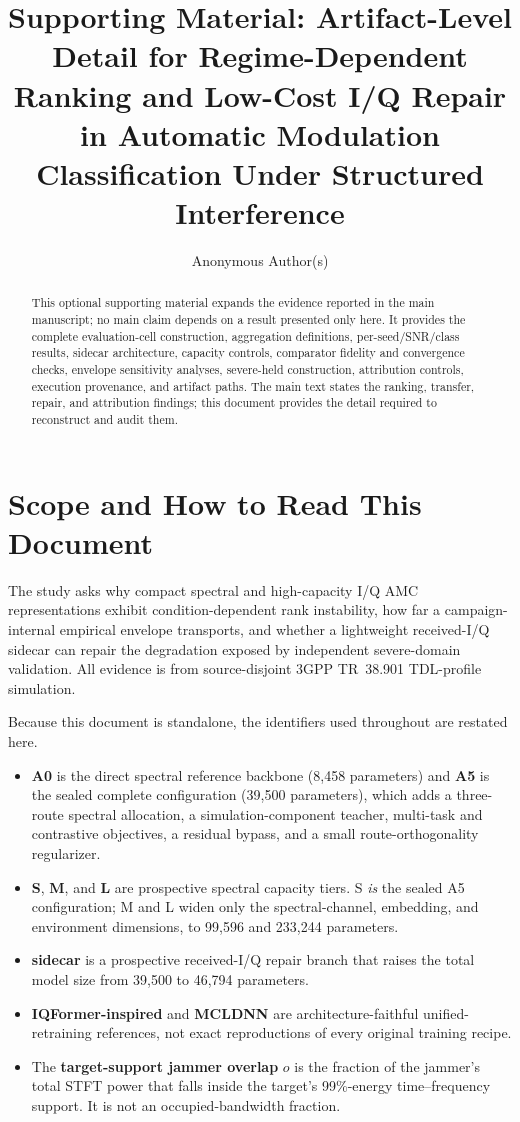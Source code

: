 \documentclass[letterpaper,onecolumn,11pt,journal]{IEEEtran}
\title{Supporting Material: Artifact-Level Detail for Regime-Dependent Ranking
and Low-Cost I/Q Repair in Automatic Modulation Classification Under Structured
Interference}
\author{Anonymous Author(s)}
\begin{document}
\maketitle

\begin{abstract}
This optional supporting material expands the evidence reported in the main
manuscript; no main claim depends on a result presented only here. It provides
the complete evaluation-cell construction, aggregation definitions,
per-seed/SNR/class results, sidecar architecture, capacity controls, comparator
fidelity and convergence checks, envelope sensitivity analyses, severe-held
construction, attribution controls, execution provenance, and artifact paths.
The main text states the ranking, transfer, repair, and attribution findings;
this document provides the detail required to reconstruct and audit them.
\end{abstract}

\section{Scope and How to Read This Document}
The study asks why compact spectral and high-capacity I/Q AMC representations
exhibit condition-dependent rank instability, how far a campaign-internal
empirical envelope transports, and whether a lightweight received-I/Q sidecar
can repair the degradation exposed by independent severe-domain
validation. All
evidence is from \mbox{source-disjoint} 3GPP TR~38.901 TDL-profile simulation.

Because this document is standalone, the identifiers used throughout are
restated here.
\begin{itemize}
  \item \textbf{A0} is the direct spectral reference backbone (8{,}458
  parameters) and \textbf{A5} is the sealed complete configuration
  (39{,}500 parameters), which adds a three-route spectral allocation, a
  simulation-component teacher, multi-task and contrastive objectives, a
  residual bypass, and a small route-orthogonality regularizer.
  \item \textbf{S}, \textbf{M}, and \textbf{L} are prospective spectral
  capacity tiers. S \emph{is} the sealed A5 configuration; M and L widen only
  the spectral-channel, embedding, and environment dimensions, to
  99{,}596 and 233{,}244 parameters.
  \item \textbf{sidecar} is a prospective received-I/Q repair branch that
  raises the total model size from 39{,}500 to 46{,}794 parameters.
  \item \textbf{IQFormer-inspired} and \textbf{MCLDNN} are
  architecture-faithful unified-retraining references, not exact reproductions
  of every original training recipe.
  \item The \textbf{target-support jammer overlap} $o$ is the fraction of the
  jammer's total STFT power that falls inside the target's 99\%-energy
  time--frequency support. It is not an occupied-bandwidth fraction.
\end{itemize}
\end{document}
